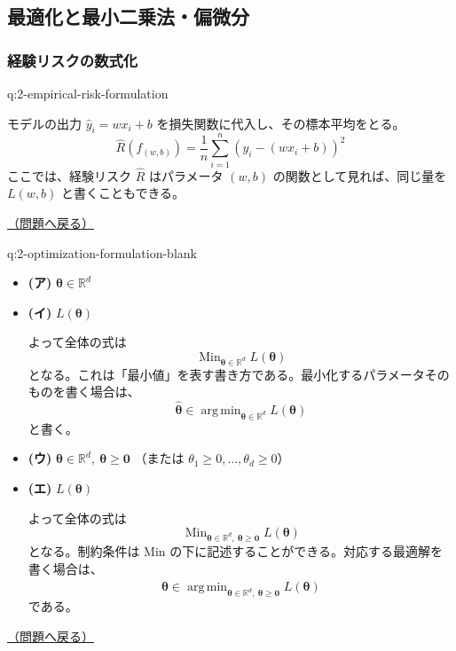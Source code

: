 \documentclass[
  pandoc]{bxjsarticle}
\begin{document}
\subsection{最適化と最小二乗法・偏微分}\label{ux6700ux9069ux5316ux3068ux6700ux5c0fux4e8cux4e57ux6cd5ux504fux5faeux5206-1}

\subsubsection{経験リスクの数式化}\label{ux7d4cux9a13ux30eaux30b9ux30afux306eux6570ux5f0fux5316-1}

\begin{answerbox}[phantomlabel=a:2-empirical-risk-formulation]{q:2-empirical-risk-formulation}

モデルの出力 \(\hat{y}_i = wx_i + b\)
を損失関数に代入し、その標本平均をとる。 \[
\hat{R}(f_{(w,b)}) = \frac{1}{n} \sum_{i=1}^n (y_i - (wx_i + b))^2
\] ここでは、経験リスク \(\hat{R}\) はパラメータ \((w,b)\)
の関数として見れば、同じ量を \(L(w,b)\) と書くこともできる。

\hfill 

\hyperref[q:2-empirical-risk-formulation]{（問題へ戻る）}

\end{answerbox}

\begin{answerbox}[phantomlabel=a:2-optimization-formulation-blank]{q:2-optimization-formulation-blank}

\begin{itemize}
\item
  \textbf{(ア)} \(\boldsymbol{\theta} \in \mathbb{R}^d\)
\item
  \textbf{(イ)} \(L(\boldsymbol{\theta})\)

  よって全体の式は \[
  \mathop{\mathrm{Min}}_{\boldsymbol{\theta} \in \mathbb{R}^d} L(\boldsymbol{\theta})
  \]
  となる。これは「最小値」を表す書き方である。最小化するパラメータそのものを書く場合は、
  \[
  \hat{\boldsymbol{\theta}} \in \mathop{\arg\,\min}_{\boldsymbol{\theta} \in \mathbb{R}^d} L(\boldsymbol{\theta})
  \] と書く。
\item
  \textbf{(ウ)}
  \(\boldsymbol{\theta} \in \mathbb{R}^d,\ \boldsymbol{\theta} \ge \mathbf{0}\)
  （または \(\theta_1 \ge 0, \dots, \theta_d \ge 0\)）
\item
  \textbf{(エ)} \(L(\boldsymbol{\theta})\)

  よって全体の式は \[
  \mathop{\mathrm{Min}}_{\boldsymbol{\theta} \in \mathbb{R}^d,\ \boldsymbol{\theta} \ge \mathbf{0}} L(\boldsymbol{\theta})
  \] となる。制約条件は \(\mathrm{Min}\)
  の下に記述することができる。対応する最適解を書く場合は、 \[
  \hat{\boldsymbol{\theta}} \in \mathop{\arg\,\min}_{\boldsymbol{\theta} \in \mathbb{R}^d,\ \boldsymbol{\theta} \ge \mathbf{0}} L(\boldsymbol{\theta})
  \] である。
\end{itemize}

\hfill 

\hyperref[q:2-optimization-formulation-blank]{（問題へ戻る）}

\end{answerbox}
\end{document}

